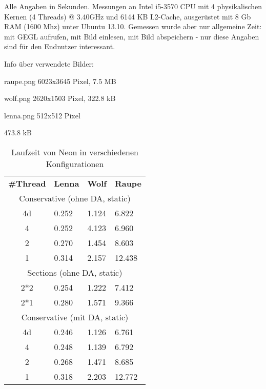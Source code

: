Alle Angaben in Sekunden. Messungen an Intel i5-3570 CPU mit 4 physikalischen Kernen (4 Threads) @ 3.40GHz und 6144 KB L2-Cache, ausgerüstet mit 8 Gb RAM (1600 Mhz) unter Ubuntu 13.10. Gemessen wurde aber nur allgemeine Zeit: mit GEGL aufrufen, mit Bild einlesen, mit Bild abspeichern - nur diese Angaben sind für den Endnutzer interessant.

Info über verwendete Bilder:

raupe.png 6023x3645 Pixel, 7.5 MB

wolf.png 2620x1503 Pixel, 322.8 kB

lenna.png 512x512 Pixel
\begin{table}[h] 473.8 kB
\centering
\begin{tabular}{c p{2cm}p{2cm}p{2cm}}
\toprule
\textbf{\#Thread} & \textbf{Lenna} & \textbf{Wolf} & \textbf{Raupe} \\

\cmidrule(r){1-4}

\multicolumn{4}{c}{Conservative (ohne DA, static)} 	\\
4d 	& 0.252		&1.124		&6.822			\\
4 	& 0.252		&4.123		&6.960 		 	\\
2	& 0.270		&1.454		&8.603			\\
1	& 0.314		&2.157		&12.438 			\\

\cmidrule(r){1-4}

\multicolumn{4}{c}{Sections (ohne DA, static)} 		\\
2*2 	& 0.254		&1.222		&7.412 		 	\\
2*1	& 0.280		&1.571		&9.366 		 	\\

\cmidrule(r){1-4}

\multicolumn{4}{c}{Conservative (mit DA, static)}	\\
4d	& 0.246		& 1.126		& 6.761			\\
4 	& 0.248		&1.139		& 6.792		 	\\
2	& 0.268		&1.471		& 8.685 		 	\\
1	& 0.318		&2.203		&12.772			\\

\bottomrule
\end{tabular}
\caption{Laufzeit von Neon in verschiedenen Konfigurationen}
\label{tab:NEON_runtime}
\end{table}

